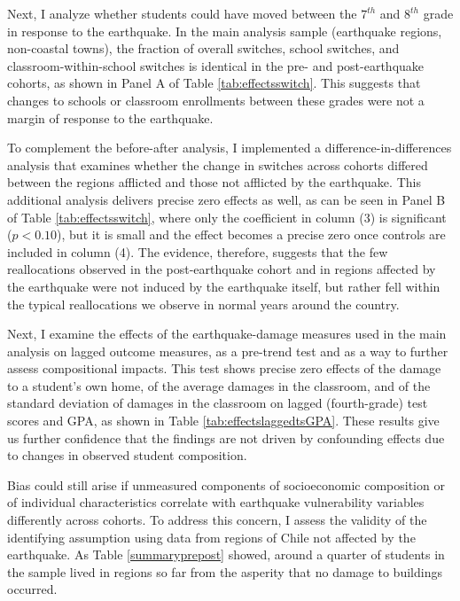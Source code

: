 Next, I analyze whether students could have moved between the $7^{th}$ and $8^{th}$ grade in response to the earthquake. In the main analysis sample (earthquake regions, non-coastal towns), the fraction of overall switches, school switches, and classroom-within-school switches is identical in the pre- and post-earthquake cohorts, as shown in Panel A of Table \ref{tab:effectsswitch}. This suggests that changes to schools or classroom enrollments between these grades were not a margin of response to the earthquake.\par





 To complement the before-after analysis, I implemented a difference-in-differences analysis that examines whether the change in switches across cohorts differed between the regions afflicted and those not afflicted by the earthquake. This additional analysis delivers precise zero effects as well, as can be seen in Panel B of Table \ref{tab:effectsswitch}, where only the coefficient in column (3) is significant ($p<0.10$), but it is small and the effect becomes a precise zero once controls are included in column (4). The evidence, therefore, suggests that the few reallocations observed in the post-earthquake cohort and in regions affected by the earthquake were not induced by the earthquake itself, but rather fell within the typical reallocations we observe in normal years around the country.\par 


Next, I examine the effects of the earthquake-damage measures used in the main analysis on lagged outcome measures, as a pre-trend test and as a way to further assess compositional impacts. This test shows precise zero effects of the damage to a student's own home, of the average damages in the classroom, and of the standard deviation of damages in the classroom on lagged (fourth-grade) test scores and GPA, as shown in Table  \ref{tab:effectslaggedtsGPA}. These results give us further confidence that the findings are not driven by confounding effects due to changes in observed student composition.\par 





Bias could still arise if unmeasured components of socioeconomic composition or of individual characteristics correlate with earthquake vulnerability variables differently across cohorts. To address this concern, I assess the validity of the identifying assumption using data from regions of Chile not affected by the earthquake. As Table \ref{summaryprepost} showed, around a quarter of students in the sample lived in regions so far from the asperity that no damage to buildings occurred. \par 

